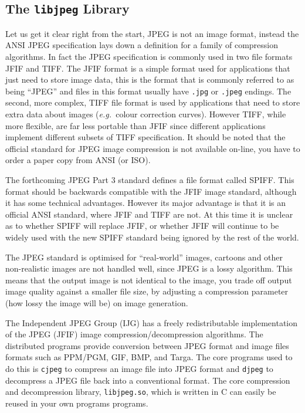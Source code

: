 \documentclass[twoside,11pt]{starlink}
\begin{document}
\subsection{The \texttt{libjpeg} Library\label{sc15_libjpeg}}

Let us get it clear right from the start, JPEG is not an image format,
instead the ANSI JPEG specification lays down a definition for a
family of compression algorithms. In fact the JPEG specification is
commonly used in two file formats JFIF and TIFF. The JFIF format is a
simple format used for applications that just need to store image
data, this is the format that is commonly referred to as being
``JPEG'' and files in this format usually have \texttt{.jpg} or \texttt{.jpeg} endings. The second, more complex, TIFF file format is used by
applications that need to store extra data about images (\emph{e.g.\
}colour correction curves). However TIFF, while more flexible, are far
less portable than JFIF since different applications implement
different subsets of TIFF specification. It should be noted that the
official standard for JPEG image compression is not available on-line,
you have to order a paper copy from ANSI (or ISO).

The forthcoming JPEG Part 3 standard defines a file format called
SPIFF. This format should be backwards compatible with the JFIF image
standard, although it has some technical advantages. However its major
advantage is that it is an official ANSI standard, where JFIF and TIFF
are not. At this time it is unclear as to whether SPIFF will replace
JFIF, or whether JFIF will continue to be widely used with the new
SPIFF standard being ignored by the rest of the world.

The JPEG standard is optimised for ``real-world'' images, cartoons and
other non-realistic images are not handled well, since JPEG is a lossy
algorithm. This means that the output image is not identical to the
image, you trade off output image quality against a smaller file size,
by adjusting a compression parameter (how lossy the image will be) on
image generation.

The Independent JPEG Group (IJG) has a freely redistributable
implementation of the JPEG (JFIF) image compression/decompression
algorithms. The distributed programs provide conversion between JPEG
format and image files formats such as PPM/PGM, GIF, BMP, and Targa.
The core programs used to do this is \texttt{cjpeg} to compress an image
file into JPEG format and \texttt{djpeg} to decompress a JPEG file back
into a conventional format. The core compression and decompression
library, \texttt{libjpeg.so}, which is written in C can easily be reused
in your own programs programs.
\end{document}
